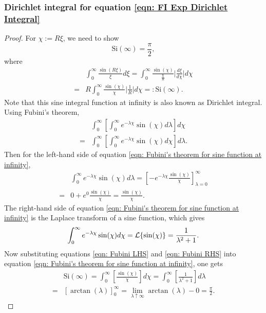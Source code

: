 \documentclass[%
 reprint,
 amsmath,amssymb,
 aps,
]{revtex4-2}
\begin{document}
\subsubsection{Dirichlet integral for equation \eqref{eqn: FI Exp Dirichlet Integral}}
\begin{proof}
    For $\chi := R\xi$, we need to show
    \begin{equation*}
        \text{Si}(\infty) = \frac{\pi}{2},
    \end{equation*}
    where
    \begin{align*}
        & \int_0^\infty \frac{\sin(R\xi)}{\xi} d\xi
        = \int_0^\infty \frac{\sin(\chi)}{\frac{\chi}{R}} \bigg|\frac{d\xi}{d\chi}\bigg| d\chi \\
        = & R \int_0^\infty \frac{\sin(\chi)}{\chi} \bigg|\frac{1}{R}\bigg| d\chi 
        =: \text{Si}(\infty).
    \end{align*}
    Note that this sine integral function at infinity is also known as Dirichlet integral.
    Using Fubini's theorem,
    \begin{align} \label{eqn: Fubini's theorem for sine function at infinity}
        & \int_0^\infty\left[\int_0^\infty e^{-\lambda\chi}\sin(\chi)d\lambda\right]d\chi \\
        = & \int_0^\infty\left[\int_0^\infty e^{-\lambda\chi}\sin(\chi)d\chi\right]d\lambda.
    \end{align}
    Then for the left-hand side of equation \eqref{eqn: Fubini's theorem for sine function at infinity},
    \begin{align} \label{eqn: Fubini LHS}
        & \int_0^\infty e^{-\lambda\chi}\sin(\chi)d\lambda = \left[-e^{-\lambda\chi}\frac{\sin(\chi)}{\chi} \right]_{\lambda = 0}^\infty \\
        = & 0 + e^0\frac{\sin(\chi)}{\chi} = \frac{\sin(\chi)}{\chi}.
    \end{align}
    The right-hand side of equation \eqref{eqn: Fubini's theorem for sine function at infinity} is the Laplace transform of a sine function, which gives
    \begin{equation} \label{eqn: Fubini RHS}
        \int_0^\infty e^{-\lambda\chi}\sin(\chi)d\chi \\
        = \mathcal{L}\{\sin(\chi)\} = \frac{1}{\lambda^2 + 1}.
    \end{equation}
    Now substituting equations \eqref{eqn: Fubini LHS} and \eqref{eqn: Fubini RHS} into equation \eqref{eqn: Fubini's theorem for sine function at infinity}, one gets
    \begin{align*}
        & \text{Si}(\infty) = \int_0^\infty\left[\frac{\sin(\chi)}{\chi}\right]d\chi = \int_0^\infty\left[\frac{1}{\lambda^2 + 1}\right]d\lambda \\
        = & [\arctan(\lambda)]_0^\infty
        = \lim_{\lambda \uparrow \infty}\arctan(\lambda) - 0 = \frac{\pi}{2}.
    \end{align*}
\end{proof}
\end{document}

